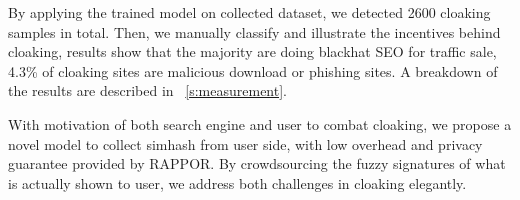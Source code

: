 By applying the trained model on collected dataset, we detected 2600 cloaking samples in total.
Then, we manually classify and illustrate the incentives behind cloaking,
results show that the majority are doing blackhat SEO for traffic sale,
4.3\% of cloaking sites are malicious download or phishing sites. A breakdown of
the results are described in ~\autoref{s:measurement}.

With motivation of both search engine and user to combat cloaking, we propose a
novel model to collect simhash
%
%
from user side, with low overhead and privacy guarantee provided by RAPPOR.
By crowdsourcing the fuzzy signatures of what is actually shown to user, we
address both challenges in cloaking elegantly.


%




%

%
%

